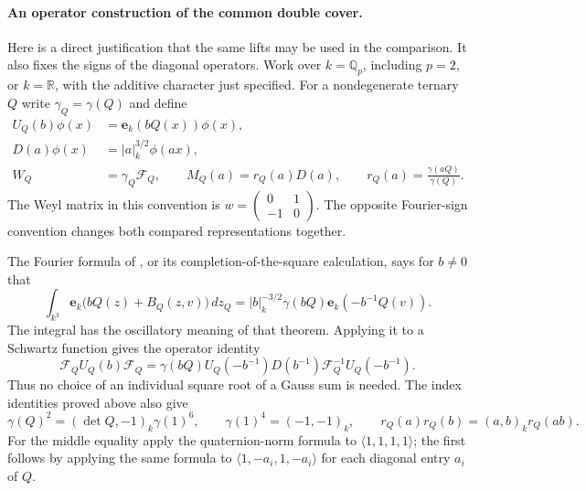\paragraph{An operator construction of the common double cover.}
Here is a direct justification that the same lifts may be used in
the comparison. It also fixes the signs of the diagonal operators.
Work over $k=\mathbb Q_p$, including $p=2$, or $k=\mathbb R$,
with the additive character just specified. For a nondegenerate
ternary $Q$ write $\gamma_Q=\gamma(Q)$ and define
\[
 \begin{split}
 U_Q(b)\phi(x)&=\mathbf e_k(bQ(x))\phi(x),\\
 D(a)\phi(x)&=|a|_k^{3/2}\phi(ax),\\
 W_Q&=\gamma_Q\mathcal F_Q,\qquad
 M_Q(a)=r_Q(a)D(a),\qquad
 r_Q(a)=\frac{\gamma(aQ)}{\gamma(Q)}.
 \end{split}
\]
The Weyl matrix in this convention is
$w=\left(\begin{smallmatrix}0&1\\-1&0\end{smallmatrix}\right)$.
The opposite Fourier-sign convention changes both compared
representations together.

The Fourier formula of \cite[I.14, Theorem~2]{weil}, or its
completion-of-the-square calculation, says for $b\ne0$ that
\[
 \int_{k^3}
 \mathbf e_k\bigl(bQ(z)+B_Q(z,v)\bigr)\,dz_Q
   =|b|_k^{-3/2}\gamma(bQ)\mathbf e_k(-b^{-1}Q(v)).
\]
The integral has the oscillatory meaning of that theorem.
Applying it to a Schwartz function gives the operator identity
\[
 \mathcal F_Q U_Q(b)\mathcal F_Q
 =\gamma(bQ)U_Q(-b^{-1})D(b^{-1})
                   \mathcal F_Q^{-1}U_Q(-b^{-1}).
\]
Thus no choice of an individual square root of a Gauss sum is
needed. The index identities proved above also give
\[
 \gamma(Q)^2=(\det Q,-1)_k\gamma(1)^6,
 \qquad \gamma(1)^4=(-1,-1)_k,
 \qquad r_Q(a)r_Q(b)=(a,b)_k r_Q(ab).
\]
For the middle equality apply the quaternion-norm formula to
$\langle1,1,1,1\rangle$; the first follows by applying the same
formula to $\langle1,-a_i,1,-a_i\rangle$ for each diagonal
entry $a_i$ of $Q$.

